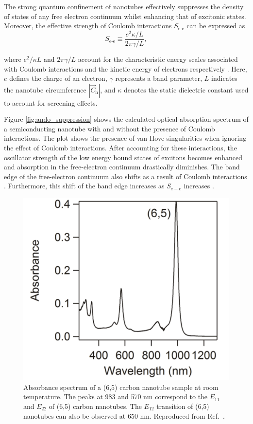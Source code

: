 The strong quantum confinement of nanotubes effectively suppresses the density of states of any free electron continuum whilst enhancing that of excitonic states. Moreover, the effective strength of Coulomb interactions $S_\text{e-e}$ can be expressed as 
\begin{equation}
	S_\text{e-e} \equiv \dfrac{e^2 \kappa / L}{2 \pi \gamma / L},
\end{equation}

where $e^2 /\kappa L$ and $2 \pi \gamma / L$ account for the characteristic energy scales associated with Coulomb interactions and the kinetic energy of electrons respectively \cite{ando2005theory}. Here, $e$ defines the charge of an electron, $\gamma$ represents a band parameter, $L$ indicates the nanotube circumference $|\vec{C}_\text{h}|$, and $\kappa$ denotes the static dielectric constant used to account for screening effects.

Figure \ref{fig:ando_suppression} shows the calculated optical absorption spectrum of a semiconducting nanotube with and without the presence of Coulomb interactions. The plot shows the presence of van Hove singularities when ignoring the effect of Coulomb interactions. After accounting for these interactions, the oscillator strength of the low energy bound states of excitons becomes enhanced and absorption in the free-electron continuum drastically diminishes. The band edge of the free-electron continuum also shifts as a result of Coulomb interactions \cite{ando1997excitons}. Furthermore, this shift of the band edge increases as $S_{e-e}$ increases \cite{ando2005theory}. 

\begin{figure}[h]
	\centering
	\includegraphics[scale=0.62]{images/chapter_optical_props/cnt_absorbance_yota}
	\caption{Absorbance spectrum of a (6,5) carbon nanotube sample at room temperature. The peaks at 983 and 570 nm correspond to the $E_{11}$ and $E_{22}$ of (6,5) carbon nanotubes. The $E_{12}$ transition of (6,5) nanotubes can also be observed at 650 nm. Reproduced from Ref.\ \cite{ichinose2017extraction}. }
	\label{fig:cnt_abs_yota}
\end{figure}

